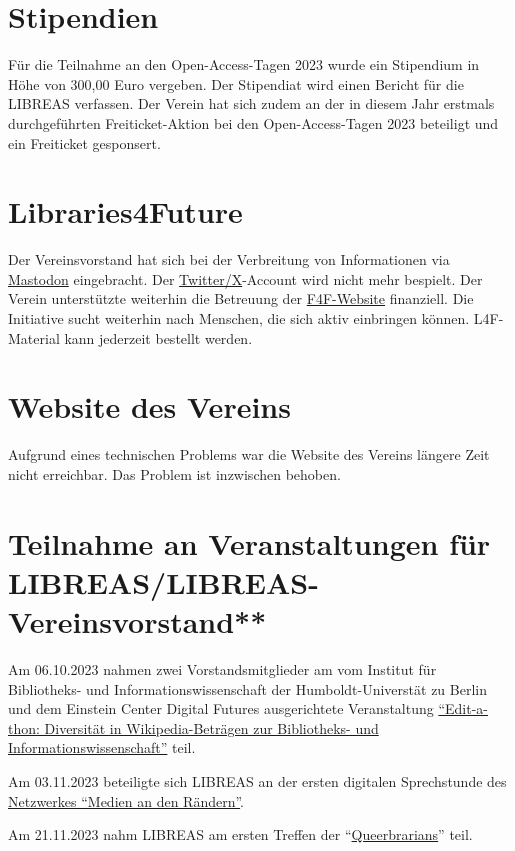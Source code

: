 \documentclass[a4paper,
fontsize=11pt,
oneside,
numbers=noperiodatend,
parskip=half-,
bibliography=totoc,
final
]{scrartcl}
\begin{document}
\hypertarget{stipendien}{%
\section{Stipendien}\label{stipendien}}

Für die Teilnahme an den Open-Access-Tagen 2023 wurde ein Stipendium in
Höhe von 300,00 Euro vergeben. Der Stipendiat wird einen Bericht für die
LIBREAS verfassen. Der Verein hat sich zudem an der in diesem Jahr
erstmals durchgeführten Freiticket-Aktion bei den Open-Access-Tagen 2023
beteiligt und ein Freiticket gesponsert.

\hypertarget{libraries4future}{%
\section{Libraries4Future}\label{libraries4future}}

Der Vereinsvorstand hat sich bei der Verbreitung von Informationen via
\href{https://climatejustice.global/@libraries4future}{Mastodon}
eingebracht. Der
\href{https://twitter.com/Libraries4F}{Twitter/X}-Account wird nicht
mehr bespielt. Der Verein unterstützte weiterhin die Betreuung der
\href{https://libraries4future.org/}{F4F-Website} finanziell. Die
Initiative sucht weiterhin nach Menschen, die sich aktiv einbringen
können. L4F-Material kann jederzeit bestellt werden.

\hypertarget{website-des-vereins}{%
\section{Website des Vereins}\label{website-des-vereins}}

Aufgrund eines technischen Problems war die Website des Vereins längere
Zeit nicht erreichbar. Das Problem ist inzwischen behoben.

\hypertarget{teilnahme-an-veranstaltungen-fuxfcr-libreaslibreas-vereinsvorstand}{%
\section{Teilnahme an Veranstaltungen für
LIBREAS/LIBREAS-Vereinsvorstand**}\label{teilnahme-an-veranstaltungen-fuxfcr-libreaslibreas-vereinsvorstand}}

Am 06.10.2023 nahmen zwei Vorstandsmitglieder am vom Institut für
Bibliotheks- und Informationswissenschaft der Humboldt-Universtät zu
Berlin und dem Einstein Center Digital Futures ausgerichtete
Veranstaltung
\href{https://www.digital-future.berlin/aktuelles/aktuelles-im-detail/news/recap-edit-a-thon-fuer-mehr-diversitaet-in-der-wikipedia1/?tx_news_pi1\%5Bcontroller\%5D=News\&tx_news_pi1\%5Baction\%5D=detail\&cHash=0b82716e054f4337bb13e5e04b7ce765}{\enquote{Edit-a-thon:
Diversität in Wikipedia-Beträgen zur Bibliotheks- und
Informationswissenschaft}} teil.

Am 03.11.2023 beteiligte sich LIBREAS an der ersten digitalen
Sprechstunde des
\href{https://www.bib-info.de/berufspraxis/medien-an-den-raendern}{Netzwerkes
\enquote{Medien an den Rändern}}.

Am 21.11.2023 nahm LIBREAS am ersten Treffen der
\enquote{\href{https://chaos.social/@fuzzyleapfrog/111362578487652002}{Queerbrarians}}
teil.

\end{document}
